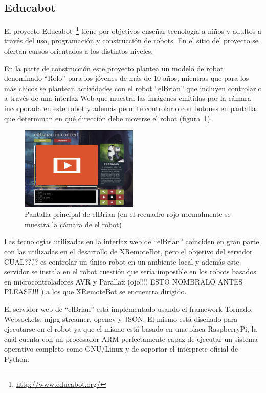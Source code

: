
\subsection{Educabot}
El proyecto Educabot~\footnote{\url{http://www.educabot.org/}} tiene por
objetivos enseñar tecnología a niños y adultos a través
del uso, programación y construcción de robots. En el sitio del proyecto
se ofertan cursos orientados a los distintos niveles.


En la parte de construcción este proyecto plantea un modelo de robot denominado
``Rolo'' para los jóvenes de más de 10 años, mientras que para los más chicos
se plantean actividades con el robot ``elBrian'' que incluyen
controlarlo a través de una interfaz Web que muestra las imágenes emitidas
por la cámara incorporada en este robot y además permite controlarlo con
botones en pantalla que determinan en qué dirección debe moverse el robot
(figura~\ref{fig:elbrian}).

\begin{figure}
    \centering
    \includegraphics[width=0.5\textwidth]{figures/elbrian-1}
    \caption{Pantalla principal de elBrian (en el recuadro rojo normalmente
        se muestra la cámara de el robot)}
    \label{fig:elbrian}
\end{figure}

Las tecnologías utilizadas en la interfaz web de ``elBrian'' coinciden en gran
parte con las utilizadas en el desarrollo de XRemoteBot, pero el objetivo del
servidor CUAL???? es controlar un único robot en un ambiente local y además este servidor
se instala en el robot cuestión que sería imposible en los robots basados en
microcontroladores AVR y Parallax (ojo!!!!  ESTO NOMBRALO ANTES PLEASE!!! ) a los que XRemoteBot se encuentra dirigido.


El servidor web de ``elBrian'' está implementado usando el framework Tornado,
Websockets, mjpg-streamer, opencv y JSON. El mismo está diseñado para ejecutarse
en el robot ya que el mismo está basado en una placa RaspberryPi, la cuál
cuenta con un procesador ARM perfectamente capaz de ejecutar un sistema
operativo completo como GNU/Linux y de soportar el intérprete oficial de Python.

